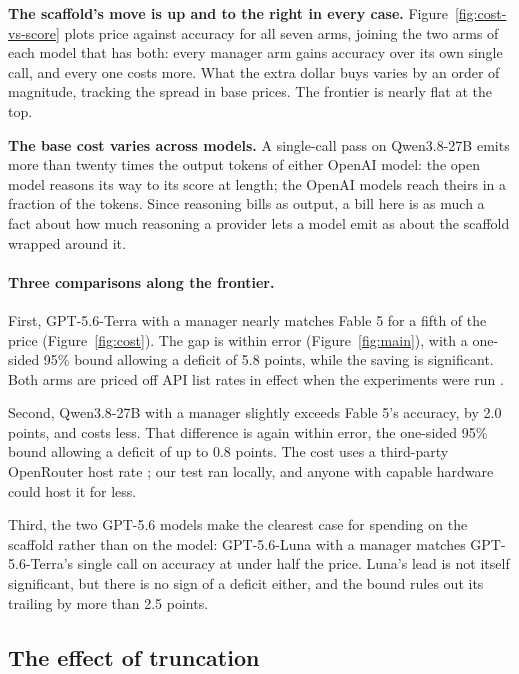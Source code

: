 \documentclass{article}
\begin{document}


\textbf{The scaffold's move is up and to the right in every case.}
Figure~\ref{fig:cost-vs-score} plots price against accuracy for all seven arms, joining the
two arms of each model that has both: every manager arm gains accuracy over its own single
call, and every one costs more. What the extra dollar buys varies by an order of magnitude,
tracking the spread in base prices. The frontier is nearly flat at the top.

\textbf{The base cost varies across models.} A single-call pass on Qwen3.8-27B emits more
than twenty times the output tokens of either OpenAI model: the open model reasons its way to
its score at length; the OpenAI models reach theirs in a fraction of the tokens. Since
reasoning bills as output, a bill here is as much a fact about how much reasoning a provider
lets a model emit as about the scaffold wrapped around it.

\paragraph{Three comparisons along the frontier.}
First, GPT-5.6-Terra with a manager nearly matches Fable 5 for a fifth of the price
(Figure~\ref{fig:cost}). The gap is within error (Figure~\ref{fig:main}), with a one-sided
95\% bound allowing a deficit of 5.8 points, while the saving is significant. Both arms are
priced off API list rates in effect when the experiments were run
\citep{openai2026price,anthropic2026price}.

Second, Qwen3.8-27B with a manager slightly exceeds Fable 5's accuracy, by 2.0 points, and costs
less. That difference is again within error, the one-sided 95\% bound allowing a deficit of up
to 0.8 points. The cost uses a third-party OpenRouter host rate \citep{openrouter2026}; our test
ran locally, and anyone with capable hardware could host it for less.

Third, the two GPT-5.6 models make the clearest case for spending on the scaffold rather than
on the model: GPT-5.6-Luna with a manager matches GPT-5.6-Terra's single call on accuracy at
under half the price. Luna's lead is not itself significant, but there is no sign of a deficit
either, and the bound rules out its trailing by more than 2.5 points.

\subsection{The effect of truncation}
\label{sec:truncation}
\end{document}
